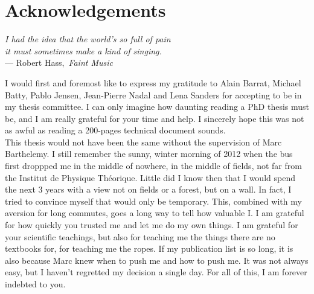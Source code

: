 


\begingroup

\let\clearpage\relax
\let\cleardoublepage\relax
\let\cleardoublepage\relax

\chapter*{Acknowledgements} %

\begin{flushright}{\slshape    
    I had the idea that the world's so full of pain \\
    it must sometimes make a kind of singing.} \\\medskip
    --- Robert Hass,\, \emph{Faint Music}~\cite{Hass:1998}
\end{flushright}


\bigskip


I would first and foremost like to express my gratitude to Alain Barrat, Michael
Batty, Pablo Jensen, Jean-Pierre Nadal and Lena Sanders for accepting to be in
my thesis committee. I can only imagine how daunting reading a PhD thesis must
be, and I am really grateful for your time and help. I sincerely hope this was
not as awful as reading a 200-pages technical document sounds.\\


This thesis would not have been the same without the supervision of Marc
Barthelemy. I still remember the sunny, winter morning of 2012 when the bus
first droppped me in the middle of nowhere, in the middle of fields, not far
from the Institut de Physique Th\'eorique. Little did I know then that I would
spend the next 3 years with a view not on fields or a forest, but on a wall.
In fact, I tried to convince myself that would only be temporary. This, combined with my aversion for long commutes,
goes a long way to tell how valuable I. I am grateful for how quickly you
trusted me and let me do my own things. I am grateful for your scientific
teachings, but also for teaching me the things there are no textbooks for, for
teaching me the ropes. If my publication list is so long, it is also because
Marc knew when to push me and how to push me. It was not always easy, but I
haven't regretted  my decision a single day. For all of this, I am forever
indebted to you.\\


